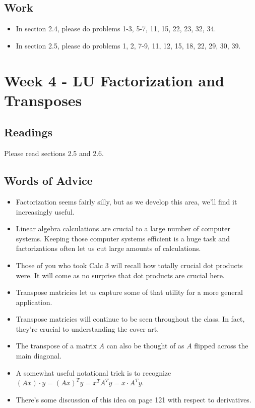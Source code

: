 	\subsection{Work}
		\begin{itemize}
			\item In section 2.4, please do problems 1-3, 5-7, 11, 15, 22, 23, 32, 34.
			\item In section 2.5, please do problems 1, 2, 7-9, 11, 12, 15, 18, 22, 29, 30, 39.
		\end{itemize}

	\clearpage



	\section{Week 4 - LU Factorization and Transposes}

	\subsection{Readings}
		Please read sections 2.5 and 2.6.

	\subsection{Words of Advice}
		\begin{itemize}
			\item Factorization seems fairly silly, but as we develop this area, we'll find it increasingly useful.
			\item Linear algebra calculations are crucial to a large number of computer systems. Keeping those computer systems efficient is a huge task and factorizations often let us cut large amounts of calculations.
			\item Those of you who took Calc 3 will recall how totally crucial dot products were. It will come as no surprise that dot products are crucial here.
			\item Transpose matricies let us capture some of that utility for a more general application.
			\item Transpose matricies will continue to be seen throughout the class. In fact, they're crucial to understanding the cover art.
			\item The transpose of a matrix $A$ can also be thought of as $A$ flipped across the main diagonal.
			\item A somewhat useful notational trick is to recognize $(Ax)\cdot y = (Ax)^Ty = x^TA^Ty = x\cdot A^Ty$. 
			\item There's some discussion of this idea on page 121 with respect to derivatives.
		\end{itemize}

